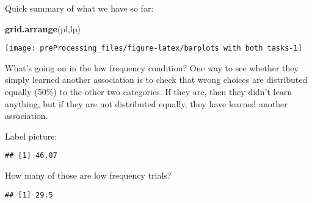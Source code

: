 \documentclass[
]{article}
\newenvironment{Shaded}{\begin{snugshade}}{\end{snugshade}}
\newcommand{\CommentTok}[1]{\textcolor[rgb]{0.56,0.35,0.01}{\textit{#1}}}
\newcommand{\DecValTok}[1]{\textcolor[rgb]{0.00,0.00,0.81}{#1}}
\newcommand{\KeywordTok}[1]{\textcolor[rgb]{0.13,0.29,0.53}{\textbf{#1}}}
\newcommand{\NormalTok}[1]{#1}
\newcommand{\OperatorTok}[1]{\textcolor[rgb]{0.81,0.36,0.00}{\textbf{#1}}}
\newcommand{\StringTok}[1]{\textcolor[rgb]{0.31,0.60,0.02}{#1}}
\begin{document}
Quick summary of what we have so far:

\begin{Shaded}
\begin{Highlighting}[]
\KeywordTok{grid.arrange}\NormalTok{(pl,lp)}
\end{Highlighting}
\end{Shaded}

\begin{center}\texttt{[image: preProcessing\_files/figure-latex/barplots with both tasks-1]} \end{center}

What's going on in the low frequency condition? One way to see whether
they simply learned another association is to check that wrong choices
are distributed equally (50\%) to the other two categories. If they are,
then they didn't learn anything, but if they are not distributed
equally, they have learned another association.

Label picture:

\begin{Shaded}
\end{Shaded}

\begin{verbatim}
## [1] 46.07
\end{verbatim}

How many of those are low frequency trials?

\begin{Shaded}
\end{Shaded}

\begin{verbatim}
## [1] 29.5
\end{verbatim}
\end{document}
